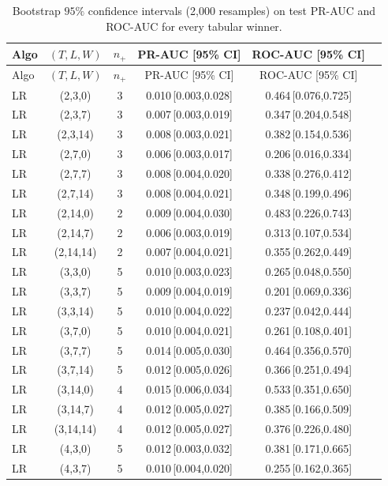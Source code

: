 \begin{longtable}{lccccc}
\caption{Bootstrap $95\%$ confidence intervals (2,000 resamples) on test PR-AUC and ROC-AUC for every tabular winner.}\label{tab:v2_tabular_ci}\\
\toprule
Algo & $(T,L,W)$ & $n_+$ & PR-AUC [95\% CI] & ROC-AUC [95\% CI] \\
\midrule
\endfirsthead
\toprule
Algo & $(T,L,W)$ & $n_+$ & PR-AUC [95\% CI] & ROC-AUC [95\% CI] \\
\midrule
\endhead
\bottomrule
\endfoot
LR & (2,3,0) & 3 & 0.010\,[0.003,0.028] & 0.464\,[0.076,0.725] \\
LR & (2,3,7) & 3 & 0.007\,[0.003,0.019] & 0.347\,[0.204,0.548] \\
LR & (2,3,14) & 3 & 0.008\,[0.003,0.021] & 0.382\,[0.154,0.536] \\
LR & (2,7,0) & 3 & 0.006\,[0.003,0.017] & 0.206\,[0.016,0.334] \\
LR & (2,7,7) & 3 & 0.008\,[0.004,0.020] & 0.338\,[0.276,0.412] \\
LR & (2,7,14) & 3 & 0.008\,[0.004,0.021] & 0.348\,[0.199,0.496] \\
LR & (2,14,0) & 2 & 0.009\,[0.004,0.030] & 0.483\,[0.226,0.743] \\
LR & (2,14,7) & 2 & 0.006\,[0.003,0.019] & 0.313\,[0.107,0.534] \\
LR & (2,14,14) & 2 & 0.007\,[0.004,0.021] & 0.355\,[0.262,0.449] \\
LR & (3,3,0) & 5 & 0.010\,[0.003,0.023] & 0.265\,[0.048,0.550] \\
LR & (3,3,7) & 5 & 0.009\,[0.004,0.019] & 0.201\,[0.069,0.336] \\
LR & (3,3,14) & 5 & 0.010\,[0.004,0.022] & 0.237\,[0.042,0.444] \\
LR & (3,7,0) & 5 & 0.010\,[0.004,0.021] & 0.261\,[0.108,0.401] \\
LR & (3,7,7) & 5 & 0.014\,[0.005,0.030] & 0.464\,[0.356,0.570] \\
LR & (3,7,14) & 5 & 0.012\,[0.005,0.026] & 0.366\,[0.251,0.494] \\
LR & (3,14,0) & 4 & 0.015\,[0.006,0.034] & 0.533\,[0.351,0.650] \\
LR & (3,14,7) & 4 & 0.012\,[0.005,0.027] & 0.385\,[0.166,0.509] \\
LR & (3,14,14) & 4 & 0.012\,[0.005,0.027] & 0.376\,[0.226,0.480] \\
LR & (4,3,0) & 5 & 0.012\,[0.003,0.032] & 0.381\,[0.171,0.665] \\
LR & (4,3,7) & 5 & 0.010\,[0.004,0.020] & 0.255\,[0.162,0.365] \\

\end{longtable}
